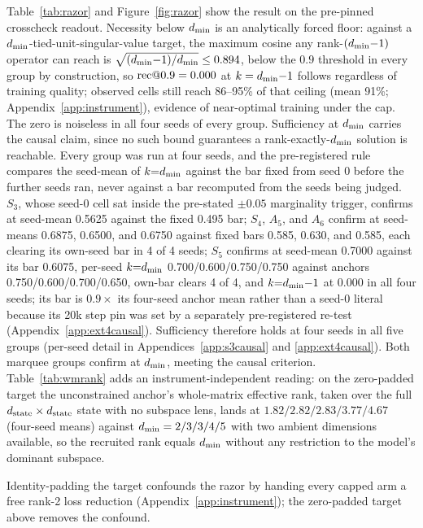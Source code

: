 Table~\ref{tab:razor} and Figure~\ref{fig:razor} show the result on the
pre-pinned crosscheck readout. Necessity below $d_{\min}$ is an analytically
forced floor: against a $d_{\min}$-tied-unit-singular-value target, the
maximum cosine any rank-$(d_{\min}{-}1)$ operator can reach is
$\sqrt{(d_{\min}{-}1)/d_{\min}} \le 0.894$, below the $0.9$ threshold in every
group by construction, so $\mathrm{rec}@0.9 = 0.000$ at $k = d_{\min}{-}1$ follows
regardless of training quality; observed cells still reach 86--95\% of
that ceiling (mean 91\%; Appendix~\ref{app:instrument}), evidence of
near-optimal training under the cap.
The zero is noiseless in all four seeds of every group.
Sufficiency at $d_{\min}$ carries the causal claim, since no such bound
guarantees a rank-exactly-$d_{\min}$ solution is reachable. Every group
was run at four seeds, and the pre-registered rule compares the
seed-mean of $k{=}d_{\min}$ against the bar fixed from seed 0 before the
further seeds ran, never against a bar recomputed from the seeds being
judged. $S_3$, whose seed-0 cell sat inside the pre-stated $\pm 0.05$
marginality trigger, confirms at seed-mean 0.5625 against the fixed
0.495 bar;
$S_4$, $A_5$, and $A_6$ confirm at seed-means 0.6875, 0.6500, and
0.6750 against fixed bars 0.585, 0.630, and 0.585, each clearing its
own-seed bar in 4 of 4 seeds; $S_5$ confirms at seed-mean 0.7000
against its bar 0.6075, per-seed $k{=}d_{\min}$ 0.700/0.600/0.750/0.750
against anchors 0.750/0.600/0.700/0.650, own-bar clears 4 of 4, and
$k{=}d_{\min}{-}1$ at 0.000 in all four seeds; its bar is $0.9\times$ its
four-seed anchor mean rather than a seed-0 literal because its 20k
step pin was set by a separately pre-registered re-test
(Appendix~\ref{app:ext4causal}). Sufficiency therefore holds at four
seeds in all five groups (per-seed detail in
Appendices~\ref{app:s3causal} and \ref{app:ext4causal}).
Both marquee groups confirm at $d_{\min}$, meeting the causal criterion.
Table~\ref{tab:wmrank} adds an instrument-independent reading: on the
zero-padded target the unconstrained anchor's whole-matrix effective
rank, taken over the full $d_{\mathrm{state}} \times d_{\mathrm{state}}$ state with no
subspace lens, lands at $1.82/2.82/2.83/3.77/4.67$ (four-seed means)
against $d_{\min} = 2/3/3/4/5$ with two ambient dimensions available, so
the recruited rank equals $d_{\min}$ without any restriction to the
model's dominant subspace.

Identity-padding the target confounds the razor by handing every capped
arm a free rank-2 loss reduction (Appendix~\ref{app:instrument});
the zero-padded target above removes the confound.
